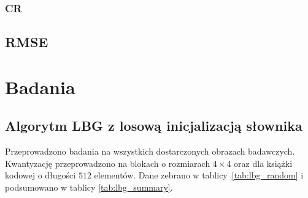 \documentclass{article}
\begin{document}
\subsubsection{CR}

\subsection{RMSE}

\section{Badania}

\subsection{Algorytm LBG z losową inicjalizacją słownika}

Przeprowadzono badania na wszystkich dostarczonych obrazach badawczych. Kwantyzację przeprowadzono na blokach o rozmiarach $4 \times 4$ oraz dla książki
kodowej o długości $512$ elementów. Dane zebrano w \mbox{tablicy \ref{tab:lbg_random}} i podsumowano w tablicy \mbox{\ref{tab:lbg_summary}}.
\end{document}
